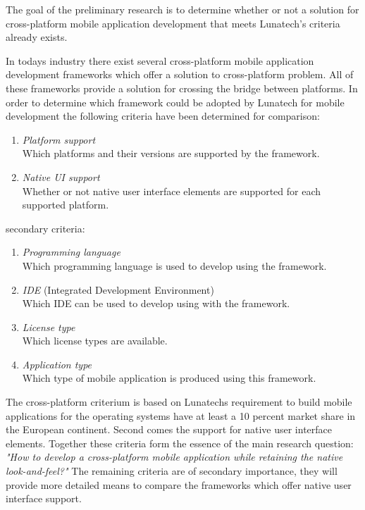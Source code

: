 
The goal of the preliminary research is to determine whether or not a solution for cross-platform mobile application development that meets Lunatech's criteria already exists.

In todays industry there exist several cross-platform mobile application development frameworks which offer a solution to cross-platform problem. All of these frameworks provide a solution for crossing the bridge between platforms. In order to determine which framework could be adopted by Lunatech for mobile development the following criteria have been determined for comparison:

\begin{enumerate}
\item \emph{Platform support}\\
Which platforms and their versions are supported by the framework.
\item \emph{Native UI support}\\
Whether or not native user interface elements are supported for each supported platform.
\end{enumerate}
\noindent secondary criteria:
\begin{enumerate}
\item \emph{Programming language}\\
Which programming language is used to develop using the framework.
\item \emph{IDE} (Integrated Development Environment)\\
Which IDE can be used to develop using with the framework.
\item \emph{License type}\\
Which license types are available.
\item \emph{Application type}\\
Which type of mobile application is produced using this framework.
\end{enumerate}

The cross-platform criterium is based on Lunatechs requirement to build mobile applications for the operating systems have at least a 10 percent market share in the European continent. Second comes the support for native user interface elements. Together these criteria form the essence of the main research question: \emph{"How to develop a cross-platform mobile application while retaining the native look-and-feel?"}
The remaining criteria are of secondary importance, they will provide more detailed means to compare the frameworks which offer native user interface support.

